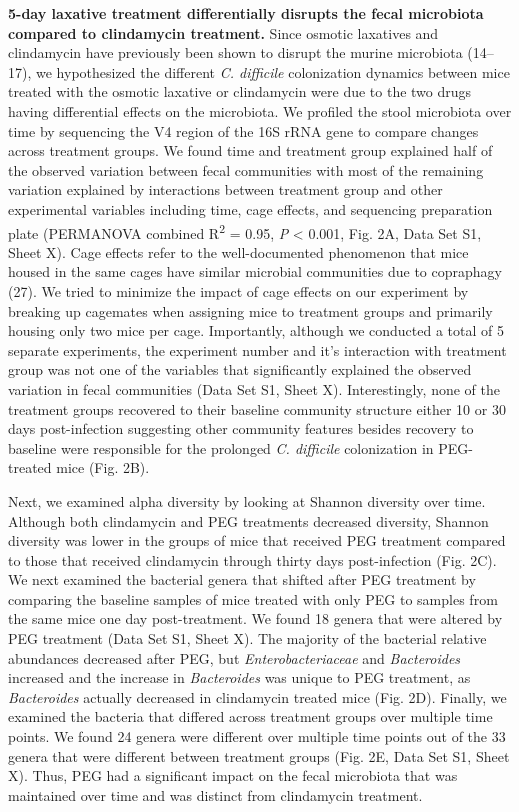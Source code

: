 \documentclass[
  11pt,
]{article}
\begin{document}
\textbf{5-day laxative treatment differentially disrupts the fecal
microbiota compared to clindamycin treatment.} Since osmotic laxatives
and clindamycin have previously been shown to disrupt the murine
microbiota (14--17), we hypothesized the different \emph{C. difficile}
colonization dynamics between mice treated with the osmotic laxative or
clindamycin were due to the two drugs having differential effects on the
microbiota. We profiled the stool microbiota over time by sequencing the
V4 region of the 16S rRNA gene to compare changes across treatment
groups. We found time and treatment group explained half of the observed
variation between fecal communities with most of the remaining variation
explained by interactions between treatment group and other experimental
variables including time, cage effects, and sequencing preparation plate
(PERMANOVA combined R\textsuperscript{2} = 0.95, \emph{P} \textless{}
0.001, Fig. 2A, Data Set S1, Sheet X). Cage effects refer to the
well-documented phenomenon that mice housed in the same cages have
similar microbial communities due to copraphagy (27). We tried to
minimize the impact of cage effects on our experiment by breaking up
cagemates when assigning mice to treatment groups and primarily housing
only two mice per cage. Importantly, although we conducted a total of 5
separate experiments, the experiment number and it's interaction with
treatment group was not one of the variables that significantly
explained the observed variation in fecal communities (Data Set S1,
Sheet X). Interestingly, none of the treatment groups recovered to their
baseline community structure either 10 or 30 days post-infection
suggesting other community features besides recovery to baseline were
responsible for the prolonged \emph{C. difficile} colonization in
PEG-treated mice (Fig. 2B).

Next, we examined alpha diversity by looking at Shannon diversity over
time. Although both clindamycin and PEG treatments decreased diversity,
Shannon diversity was lower in the groups of mice that received PEG
treatment compared to those that received clindamycin through thirty
days post-infection (Fig. 2C). We next examined the bacterial genera
that shifted after PEG treatment by comparing the baseline samples of
mice treated with only PEG to samples from the same mice one day
post-treatment. We found 18 genera that were altered by PEG treatment
(Data Set S1, Sheet X). The majority of the bacterial relative
abundances decreased after PEG, but \emph{Enterobacteriaceae} and
\emph{Bacteroides} increased and the increase in \emph{Bacteroides} was
unique to PEG treatment, as \emph{Bacteroides} actually decreased in
clindamycin treated mice (Fig. 2D). Finally, we examined the bacteria
that differed across treatment groups over multiple time points. We
found 24 genera were different over multiple time points out of the 33
genera that were different between treatment groups (Fig. 2E, Data Set
S1, Sheet X). Thus, PEG had a significant impact on the fecal microbiota
that was maintained over time and was distinct from clindamycin
treatment.
\end{document}
